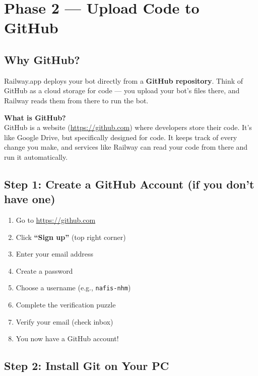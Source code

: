 
\chapter{Phase 2 --- Upload Code to GitHub}

\section{Why GitHub?}

Railway.app deploys your bot directly from a \textbf{GitHub repository}. Think of GitHub as a cloud storage for code --- you upload your bot's files there, and Railway reads them from there to run the bot.

\begin{infobox}
\textbf{What is GitHub?}\\
GitHub is a website (\url{https://github.com}) where developers store their code. It's like Google Drive, but specifically designed for code. It keeps track of every change you make, and services like Railway can read your code from there and run it automatically.
\end{infobox}

\section{Step 1: Create a GitHub Account (if you don't have one)}

\begin{enumerate}[leftmargin=1.5cm]
    \item Go to \url{https://github.com}
    \item Click \textbf{``Sign up''} (top right corner)
    \item Enter your email address
    \item Create a password
    \item Choose a username (e.g., \texttt{nafis-nhm})
    \item Complete the verification puzzle
    \item Verify your email (check inbox)
    \item You now have a GitHub account!
\end{enumerate}

\section{Step 2: Install Git on Your PC}

